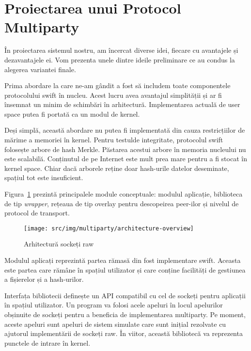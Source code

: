 \section{Proiectarea unui Protocol Multiparty}
\label{sec:multiparty:design}

În proiectarea sistemul nostru, am încercat diverse idei, fiecare cu
avantajele și dezavantajele ei. Vom prezenta unele dintre ideile
preliminare ce au condus la alegerea variantei finale.

Prima abordare la care ne-am gândit a fost să includem toate componentele
protocolului swift în nucleu. Acest lucru avea avantajul simplității și ar
fi însemnat un minim de schimbări în arhitectură. Implementarea actuală de
user space putea fi portată ca un modul de kernel.

Deși simplă, această abordare nu putea fi implementată din cauza
restricțiilor de mărime a memoriei în kernel. Pentru testulde integritate,
protocolul swift folosește arbore de hash Merkle. Păstarea acestui arbore
în memoria nucleului nu este scalabilă. Conținutul de pe Internet este mult
prea mare pentru a fi stocat în kernel space. Chiar dacă arborele reține
doar hash-urile datelor deseminate, spațiul tot este insuficient.

Figura~\ref{fig:multiparty:architecture-overview} prezintă principalele module
conceptuale: modulul aplicație, biblioteca de tip \textit{wrapper}, rețeaua de
tip overlay pentru descopeirea peer-ilor și nivelul de protocol de transport.

\begin{figure}
  \centering
  \texttt{[image: src/img/multiparty/architecture-overview]}
  \caption{Arhitectură sockeți raw}
  \label{fig:multiparty:architecture-overview}
\end{figure}

Modulul aplicați reprezintă partea rămasă din fost implementare swift. Aceasta
este partea care rămâne în spațiul utilizator și care conține facilități de
gestiunea a fișierelor și a hash-urilor.

Interfața bibliotecii definește un API compatibil cu cel de sockeți pentru
aplicații în spațiul utilizator. Un program va folosi acele apeluri în locul
apelurilor obșinuite de sockeți pentru a beneficia de implementarea
multiparty. Pe moment, aceste apeluri sunt apeluri de sistem simulate care
sunt inițial rezolvate cu ajutorul implementării de sockeți raw. În viitor,
această bibliotecă va reprezenta punctele de intrare în kernel.

